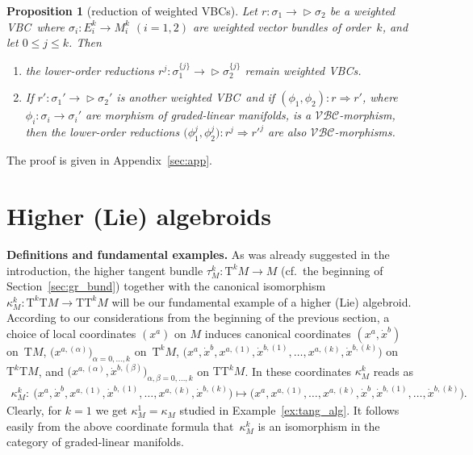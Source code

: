 \documentclass[pdftex]{sigma}
\newcommand{\ZM}{{VBC}} %
\newcommand{\degree}{{order}}
\newcommand{\ra}{\rightarrow}
\newcommand{\mZM}{\Rightarrow}
\newcommand{\T}{\mathrm{T}} %
\newcommand{\TT}[1]{\mathrm{T}^{#1}} %
\newcommand{\catZM}{{\mathcal{VBC}}} %
\def\relto{\rightarrow\!\!\vartriangleright} %
\numberwithin{equation}{section}
\newtheorem{prop}[thm]{Proposition}
\theoremstyle{definition}
\begin{document}
\begin{prop}[reduction of weighted \ZM s]\label{prop:red_h_to_l} Let $r\colon \sigma_1\relto \sigma_2$ be a weighted \ZM\ where $\sigma_i\colon E_i^k\ra M_i^k$ $(i=1, 2)$ are weighted vector bundles of \degree\ $k$, and let $0\leq j\leq k$. Then
\begin{enumerate}[$(i)$]\itemsep=0pt
 \item \label{prop:red_h_to_l:i1} the lower-order reductions $r^j\colon \sigma^{\{j\}}_1\relto \sigma^{\{j\}}_2$ remain weighted \ZM s.
 \item \label{prop:red_h_to_l:i2} If $r'\colon \sigma_1' \relto \sigma_2'$ is another weighted \ZM\ and if $(\phi_1, \phi_2)\colon r \mZM r'$, where $\phi_i\colon \sigma_i \ra \sigma_i'$ are morphism of graded-linear manifolds, is a $\catZM$-morphism, then the lower-order reductions $\big(\phi_1^j, \phi_2^j\big)\colon r^j \mZM {r'}^j$ are also $\catZM$-morphisms.
\end{enumerate}
\end{prop}

 The proof is given in Appendix~\ref{sec:app}.

\section{Higher (Lie) algebroids}\label{sec:high_alg}

{\bf Definitions and fundamental examples.} As was already suggested in the introduction, the higher tangent bundle $\tau^k_M\colon \TT{k} M\ra M$ (cf.\ the beginning of Section~\ref{sec:gr_bund}) together with the canonical isomorphism $\kappa^k_M\colon \TT{k} \T M\ra \T \TT{k} M$ will be our fundamental example of a higher (Lie) algebroid. According to our considerations from the beginning of the previous section, a choice of local coordinates $(x^a)$ on $M$ induces canonical coordinates $(x^a,\dot x^b)$ on~$\T M$, $\big(x^{a,(\alpha)}\big)_{\alpha=0,\hdots,k}$ on~$\TT{k} M$, $\big(x^{a},\dot x^{b},x^{a,(1)},\dot x^{b,(1)},\hdots,x^{a,(k)},\dot x^{b, (k)}\big)$ on $\TT{k}\T M$, and $\big(x^{a,(\alpha)},\dot x^{b,(\beta)}\big)_{\alpha,\beta=0,\hdots,k}$ on $\T\TT{k} M$. In these coordinates $\kappa^k_M$ reads as
\begin{gather*} \kappa^k_M\colon \ \big(x^{a},\dot x^{b},x^{a,(1)},\dot x^{b,(1)},\hdots,x^{a,(k)},\dot x^{b, (k)}\big)\longmapsto \big(x^{a},x^{a,(1)},\hdots,x^{a,(k)},\dot x^{b},\dot x^{b,(1)},\hdots,\dot x^{b,(k)}\big).\end{gather*}
Clearly, for $k=1$ we get $\kappa^1_M=\kappa_M$ studied in Example~\ref{ex:tang_alg}. It follows easily from the above coordinate formula that~$\kappa^k_M$ is an isomorphism in the category of graded-linear manifolds.
\end{document}
